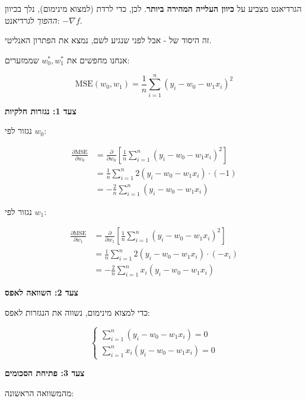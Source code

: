 הגרדיאנט מצביע על \textbf{כיוון העלייה המהירה ביותר}. לכן, כדי לרדת (למצוא מינימום), נלך בכיוון \textit{ההפוך} לגרדיאנט: $-\nabla f$.

זה היסוד של  - אבל לפני שנגיע לשם, נמצא את הפתרון האנליטי.


אנחנו מחפשים את $w_0^*, w_1^*$ שממזערים:

\begin{equation}
\text{MSE}(w_0, w_1) = \frac{1}{n} \sum_{i=1}^{n} (y_i - w_0 - w_1 x_i)^2
\end{equation}

\textbf{צעד \num{1}: נגזרות חלקיות}

נגזור לפי $w_0$:

\begin{align}
\frac{\partial \text{MSE}}{\partial w_0} &= \frac{\partial}{\partial w_0} \left[ \frac{1}{n} \sum_{i=1}^{n} (y_i - w_0 - w_1 x_i)^2 \right] \nonumber \\
&= \frac{1}{n} \sum_{i=1}^{n} 2(y_i - w_0 - w_1 x_i) \cdot (-1) \nonumber \\
&= -\frac{2}{n} \sum_{i=1}^{n} (y_i - w_0 - w_1 x_i)
\end{align}

נגזור לפי $w_1$:

\begin{align}
\frac{\partial \text{MSE}}{\partial w_1} &= \frac{\partial}{\partial w_1} \left[ \frac{1}{n} \sum_{i=1}^{n} (y_i - w_0 - w_1 x_i)^2 \right] \nonumber \\
&= \frac{1}{n} \sum_{i=1}^{n} 2(y_i - w_0 - w_1 x_i) \cdot (-x_i) \nonumber \\
&= -\frac{2}{n} \sum_{i=1}^{n} x_i(y_i - w_0 - w_1 x_i)
\end{align}

\textbf{צעד \num{2}: השוואה לאפס}

כדי למצוא מינימום, נשווה את הנגזרות לאפס:

\begin{equation}
\begin{cases}
\sum_{i=1}^{n} (y_i - w_0 - w_1 x_i) = 0 \\
\sum_{i=1}^{n} x_i(y_i - w_0 - w_1 x_i) = 0
\end{cases}
\end{equation}

\textbf{צעד \num{3}: פתיחת הסכומים}

מהמשוואה הראשונה:

